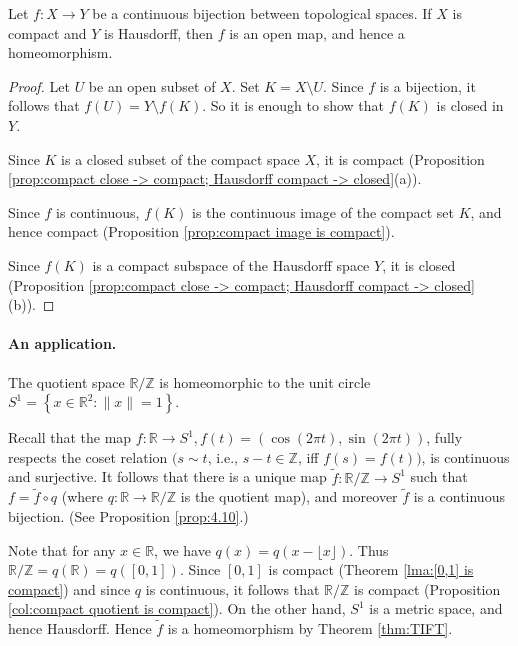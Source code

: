 \documentclass[a4paper,11pt]{article}
\begin{document}
\begin{theorem}\label{thm:TIFT}
    Let $f: X \rightarrow Y$ be a continuous bijection between topological spaces. If $X$ is compact and $Y$ is Hausdorff, then $f$ is an open map, and hence a homeomorphism.
\end{theorem}
\begin{proof}
    Let $U$ be an open subset of $X$. Set $K=X \setminus U$. Since $f$ is a bijection, it follows that $f(U)=Y \setminus f(K)$. So it is enough to show that $f(K)$ is closed in $Y$.

Since $K$ is a closed subset of the compact space $X$, it is compact (Proposition \ref{prop:compact close -> compact; Hausdorff compact -> closed}(a)).

Since $f$ is continuous, $f(K)$ is the continuous image of the compact set $K$, and hence compact (Proposition \ref{prop:compact image is compact}).

Since $f(K)$ is a compact subspace of the Hausdorff space $Y$, it is closed (Proposition \ref{prop:compact close -> compact; Hausdorff compact -> closed}(b)).
\end{proof}

\paragraph*{An application.} The quotient space $\mathbb{R} / \mathbb{Z}$ is homeomorphic to the unit circle $S^{1}=\left\{x \in \mathbb{R}^{2}:\|x\|=1\right\}$.

Recall that the map $f: \mathbb{R} \rightarrow S^{1}, f(t)=(\cos (2 \pi t), \sin (2 \pi t))$, fully respects the coset relation $(s \sim t$, i.e., $s-t \in \mathbb{Z}$, iff $f(s)=f(t))$, is continuous and surjective. It follows that there is a unique map $\tilde{f}: \mathbb{R} / \mathbb{Z} \rightarrow S^{1}$ such that $f=\tilde{f} \circ q$ (where $q: \mathbb{R} \rightarrow \mathbb{R} / \mathbb{Z}$ is the quotient map), and moreover $\tilde{f}$ is a continuous bijection. (See Proposition \ref{prop:4.10}.)

Note that for any $x \in \mathbb{R}$, we have $q(x)=q(x-\lfloor x\rfloor)$. Thus $\mathbb{R} / \mathbb{Z}=q(\mathbb{R})=q([0,1])$. Since $[0,1]$ is compact (Theorem \ref{lma:[0,1] is compact}) and since $q$ is continuous, it follows that $\mathbb{R} / \mathbb{Z}$ is compact (Proposition \ref{col:compact quotient is compact}). On the other hand, $S^{1}$ is a metric space, and hence Hausdorff. Hence $\tilde{f}$ is a homeomorphism by Theorem \ref{thm:TIFT}.
\end{document}
